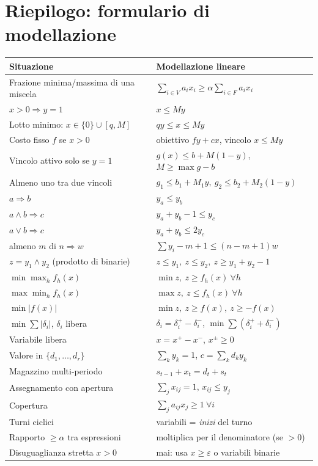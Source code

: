 \chapter{Riepilogo: formulario di modellazione}

\begin{center}
\renewcommand{\arraystretch}{1.3}
\small
\begin{tabular}{@{}p{}p{}@{}}
\toprule
\textbf{Situazione} & \textbf{Modellazione lineare}\\ \midrule
Frazione minima/massima di una miscela & $\sum_{i\in V}a_ix_i\ge\alpha\sum_{i\in F}a_ix_i$\\
$x>0\Rightarrow y=1$ & $x\le My$\\
Lotto minimo: $x\in\{0\}\cup[q,M]$ & $qy\le x\le My$\\
Costo fisso $f$ se $x>0$ & obiettivo $fy+cx$, vincolo $x\le My$\\
Vincolo attivo solo se $y=1$ & $g(x)\le b+M(1-y)$, $M\ge\max g-b$\\
Almeno uno tra due vincoli & $g_1\le b_1+M_1y,\ g_2\le b_2+M_2(1-y)$\\
$a\Rightarrow b$ & $y_a\le y_b$\\
$a\land b\Rightarrow c$ & $y_a+y_b-1\le y_c$\\
$a\lor b\Rightarrow c$ & $y_a+y_b\le2y_c$\\
almeno $m$ di $n\Rightarrow w$ & $\sum y_i-m+1\le(n-m+1)w$\\
$z=y_1\land y_2$ (prodotto di binarie) & $z\le y_1,\ z\le y_2,\ z\ge y_1+y_2-1$\\
$\min\max_h f_h(x)$ & $\min z,\ z\ge f_h(x)\ \forall h$\\
$\max\min_h f_h(x)$ & $\max z,\ z\le f_h(x)\ \forall h$\\
$\min|f(x)|$ & $\min z,\ z\ge f(x),\ z\ge-f(x)$\\
$\min\sum|\delta_i|$, $\delta_i$ libera & $\delta_i=\delta_i^+-\delta_i^-$, $\min\sum(\delta_i^++\delta_i^-)$\\
Variabile libera & $x=x^+-x^-$, $x^\pm\ge0$\\
Valore in $\{d_1,\dots,d_r\}$ & $\sum_ky_k=1$, $c=\sum_kd_ky_k$\\
Magazzino multi-periodo & $s_{t-1}+x_t=d_t+s_t$\\
Assegnamento con apertura & $\sum_jx_{ij}=1$, $x_{ij}\le y_j$\\
Copertura & $\sum_ja_{ij}x_j\ge1\ \forall i$\\
Turni ciclici & variabili = \emph{inizi} del turno\\
Rapporto $\ge\alpha$ tra espressioni & moltiplica per il denominatore (se $>0$)\\
Disuguaglianza stretta $x>0$ & mai: usa $x\ge\varepsilon$ o variabili binarie\\
\bottomrule
\end{tabular}
\end{center}

